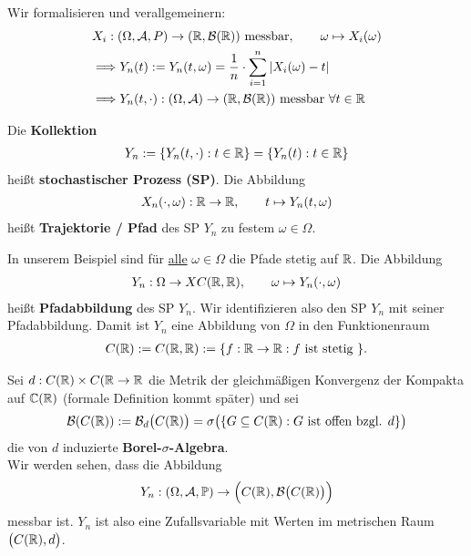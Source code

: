 Wir formalisieren und verallgemeinern:
\begin{align*}
&X_i:(\Omega, \mathcal{A},P)\to(\mathbb{R},\mathcal{B}(\mathbb{R}))\text{ messbar},\qquad\omega\mapsto X_i(\omega)\\
&\Longrightarrow
Y_n(t):=Y_n(t,\omega)=
\frac{1}{n}\cdot\sum\limits_{i=1}^n\left|X_i(\omega)-t\right|\\
&\Longrightarrow
Y_n(t,\cdot):(\Omega,\mathcal{A})\to(\mathbb{R},\mathcal{B}(\mathbb{R}))\text{ messbar }\forall t\in\mathbb{R}
\end{align*}

\begin{defi}
Die \textbf{Kollektion}
\begin{align*}
Y_n:=\lbrace Y_n(t,\cdot):t\in\mathbb{R}\rbrace
=\lbrace Y_n(t):t\in\mathbb{R}\rbrace
\end{align*}
heißt \textbf{stochastischer Prozess (SP)}. Die Abbildung
\begin{align*}
X_n(\cdot,\omega):\mathbb{R}\to\mathbb{R},\qquad t\mapsto Y_n(t,\omega)
\end{align*}
heißt \textbf{Trajektorie / Pfad} des SP $Y_n$ zu festem $\omega\in\Omega$.
\end{defi}

In unserem Beispiel sind für \underline{alle} $\omega\in\Omega$ die Pfade stetig auf $\mathbb{R}$. Die Abbildung
\begin{align*}
Y_n:\Omega\to X C(\mathbb{R},\mathbb{R}),\qquad\omega\mapsto Y_n(\cdot,\omega)
\end{align*}
heißt \textbf{Pfadabbildung} des SP $Y_n$. Wir identifizieren also den SP $Y_n$ mit seiner Pfadabbildung. Damit ist $Y_n$ eine Abbildung von $\Omega$ in den Funktionenraum 
\begin{align*}
C(\mathbb{R}):=C(\mathbb{R},\mathbb{R}):=\lbrace f:\mathbb{R}\to\mathbb{R}: f\text{ ist stetig }\rbrace.
\end{align*}

Sei $d:C(\mathbb{R})\times C(\mathbb{R}\to\mathbb{R}$ die Metrik der gleichmäßigen Konvergenz der Kompakta auf $\mathbb{C}(\mathbb{R})$ (formale Definition kommt später) und sei
\begin{align*}
\mathcal{B}(C(\mathbb{R})):=\mathcal{B}_d\big(C(\mathbb{R})\big)=\sigma\big(\lbrace G\subseteq C(\mathbb{R}):G\text{ ist offen bzgl. }d\rbrace\big)
\end{align*}
die von $d$ induzierte \textbf{Borel-$\sigma$-Algebra}.\\
Wir werden sehen, dass die Abbildung
\begin{align*}
Y_n:(\Omega,\mathcal{A},\mathbb{P})\to\Big(C(\mathbb{R}),\mathcal{B}\big(C(\mathbb{R})\big)\Big)
\end{align*}
messbar ist. $Y_n$ ist also eine Zufallsvariable mit Werten im metrischen Raum $\big(C(\mathbb{R}),d\big)$.


